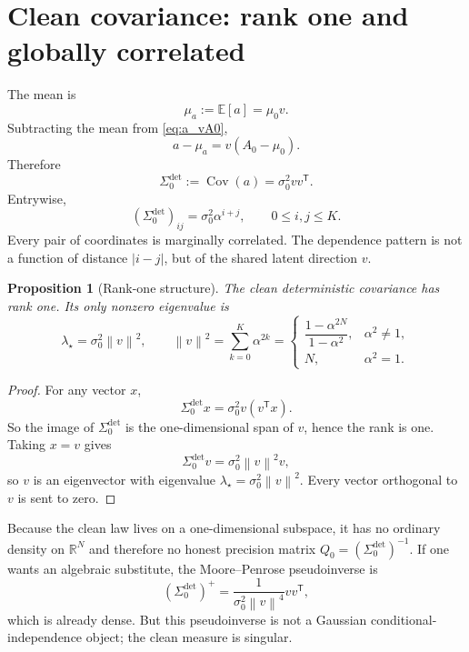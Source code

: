 \documentclass[11pt]{article}
\newtheorem{proposition}{Proposition}[section]
\newcommand{\R}{\mathbb{R}}
\newcommand{\E}{\mathbb{E}}
\newcommand{\Cov}{\operatorname{Cov}}
\newcommand{\trans}{\mathsf{T}}
\newcommand{\norm}[1]{\left\lVert #1 \right\rVert}
\newcommand{\abs}[1]{\left| #1 \right|}
\begin{document}
\section{Clean covariance: rank one and globally correlated}
The mean is
\[
 \mu_a:=\E[a]=\mu_0 v.
\]
Subtracting the mean from \eqref{eq:a_vA0},
\[
 a-\mu_a=v(A_0-\mu_0).
\]
Therefore
\begin{equation}\label{eq:sigma0_det}
\Sigma_0^{\mathrm{det}}
:=
\Cov(a)
=
\sigma_0^2 vv^\trans.
\end{equation}
Entrywise,
\begin{equation}\label{eq:sigma0_det_entries}
(\Sigma_0^{\mathrm{det}})_{ij}=\sigma_0^2\alpha^{i+j},
\qquad 0\le i,j\le K.
\end{equation}
Every pair of coordinates is marginally correlated. The dependence pattern is not a function of distance $\abs{i-j}$, but of the shared latent direction $v$.

\begin{proposition}[Rank-one structure]\label{prop:rankone}
The clean deterministic covariance has rank one. Its only nonzero eigenvalue is
\begin{equation}\label{eq:only_eig}
\lambda_{\star}=\sigma_0^2\norm{v}^2,
\qquad
\norm{v}^2=\sum_{k=0}^{K}\alpha^{2k}
=
\begin{cases}
\dfrac{1-\alpha^{2N}}{1-\alpha^2}, & \alpha^2\ne 1,\\[2mm]
N, & \alpha^2=1.
\end{cases}
\end{equation}
\end{proposition}

\begin{proof}
For any vector $x$,
\[
\Sigma_0^{\mathrm{det}}x=\sigma_0^2 v(v^\trans x).
\]
So the image of $\Sigma_0^{\mathrm{det}}$ is the one-dimensional span of $v$, hence the rank is one. Taking $x=v$ gives
\[
\Sigma_0^{\mathrm{det}}v=\sigma_0^2\norm{v}^2v,
\]
so $v$ is an eigenvector with eigenvalue $\lambda_\star=\sigma_0^2\norm{v}^2$. Every vector orthogonal to $v$ is sent to zero.
\end{proof}

Because the clean law lives on a one-dimensional subspace, it has no ordinary density on $\R^N$ and therefore no honest precision matrix $Q_0=(\Sigma_0^{\mathrm{det}})^{-1}$. If one wants an algebraic substitute, the Moore--Penrose pseudoinverse is
\begin{equation}\label{eq:pseudoinverse}
(\Sigma_0^{\mathrm{det}})^+
=
\frac{1}{\sigma_0^2\norm{v}^4}vv^\trans,
\end{equation}
which is already dense. But this pseudoinverse is not a Gaussian conditional-independence object; the clean measure is singular.
\end{document}
